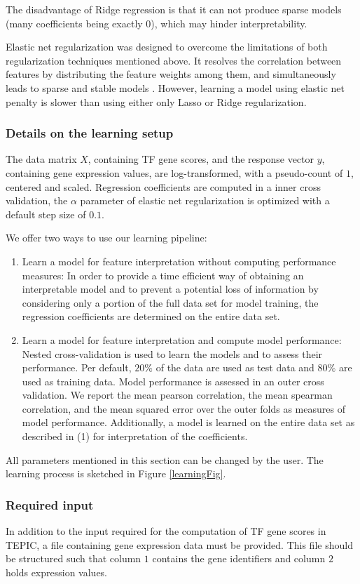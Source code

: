 \documentclass{article}
\begin{document}
The disadvantage of Ridge regression is that it can not produce sparse models (many coefficients being exactly 0), which may hinder interpretability. 

Elastic net regularization was designed to overcome the limitations of both regularization techniques mentioned above.
It resolves the correlation between features by distributing the feature weights among them, and simultaneously leads to sparse and stable models \cite{Zou05regularizationand}. 
However, learning a model using elastic net penalty is slower than using either only Lasso or Ridge regularization.

\subsubsection{Details on the learning setup}
The data matrix $X$, containing TF gene scores, and the response vector $y$, containing gene expression values, are log-transformed, 
with a pseudo-count of $1$, centered and scaled. 
Regression coefficients are computed in a inner cross validation,
the $\alpha$ parameter of elastic net regularization is optimized with a default step size of $0.1$.

We offer two ways to use our learning pipeline:
\begin{enumerate}
\item{Learn a model for feature interpretation without computing performance measures:
In order to provide a time efficient way of obtaining an interpretable model and to prevent a potential loss of information
by considering only a portion of the full data set for model training, the regression coefficients are determined on the entire data set.}
\item{Learn a model for feature interpretation and compute model performance: 
Nested cross-validation is used to learn the models and to assess their performance. 
Per default, $20\%$ of the data are used as test data and $80\%$ are used as training data. 
Model performance is assessed in an outer cross validation. 
We report the mean pearson correlation, the mean spearman correlation, and the mean squared error over the outer folds as measures of model performance.
Additionally, a model is learned on the entire data set as described in (1) for interpretation of the coefficients.}
\end{enumerate}
All parameters mentioned in this section can be changed by the user. The learning process is sketched in Figure \ref{learningFig}.

\subsubsection{Required input}
In addition to the input required for the computation of TF gene scores in TEPIC, a file containing gene expression data must be provided.
This file should be structured such that column $1$ contains the gene identifiers and column $2$ holds expression values.
\end{document}
